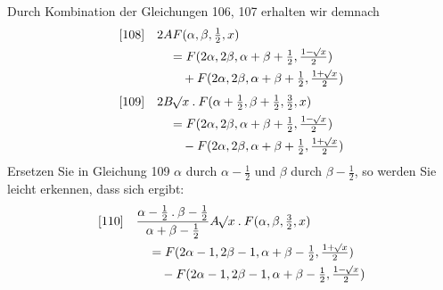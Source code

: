 Durch Kombination der Gleichungen 106, 107 erhalten wir demnach
\[
\begin{aligned}
{}[108]\quad&2AF(\alpha,\beta,\tfrac12,x)\\
&\quad=F(2\alpha,2\beta,\alpha+\beta+\tfrac12,\tfrac{1-\mathord{{}^{}\!\surd}x}2)\\&\qquad+F(2\alpha,2\beta,\alpha+\beta+\tfrac12,\tfrac{1+\mathord{{}^{}\!\surd}x}2)
\end{aligned}
\]
\[
\begin{aligned}
{}[109]\quad&2B\mathord{{}^{}\!\surd}x\mathbin{.}F(\alpha+\tfrac12,\beta+\tfrac12,\tfrac32,x)\\
&\quad=F(2\alpha,2\beta,\alpha+\beta+\tfrac12,\tfrac{1-\mathord{{}^{}\!\surd}x}2)\\&\qquad-F(2\alpha,2\beta,\alpha+\beta+\tfrac12,\tfrac{1+\mathord{{}^{}\!\surd}x}2)
\end{aligned}
\]
Ersetzen Sie in Gleichung 109 $\alpha$ durch $\alpha-\frac12$ und $\beta$ durch $\beta-\frac12$, so werden Sie leicht erkennen, dass sich ergibt:
\[
\begin{aligned}
{}[110]\quad&\frac{\alpha-\tfrac12\mathbin{.}\beta-\tfrac12}{\alpha+\beta-\tfrac12}A\mathord{{}^{}\!\surd}x\mathbin{.}F(\alpha,\beta,\tfrac32,x)\\
&\quad=F(2\alpha-1,2\beta-1,\alpha+\beta-\tfrac12,\tfrac{1+\mathord{{}^{}\!\surd}x}2)\\&\qquad-F(2\alpha-1,2\beta-1,\alpha+\beta-\tfrac12,\tfrac{1-\mathord{{}^{}\!\surd}x}2)
\end{aligned}
\]
